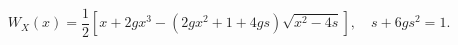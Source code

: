\begin{equation}
    W_X(x)  =\frac12\left[x+2gx^3
                          -(2gx^2+1+4gs)\sqrt{x^2-4s}\right], \quad s+6gs^2 =1.
    \label{eq:qtm-one-resolvent} 
\end{equation}%
